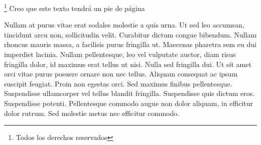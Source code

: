 \documentclass{article}
\begin{document}
    \footnote{Todos los derechos reservados} Creo que este texto tendrá un pie de página

    Nullam at purus vitae erat sodales molestie a quis urna. Ut sed leo accumsan, tincidunt arcu non, sollicitudin velit. Curabitur dictum congue bibendum. Nullam rhoncus mauris massa, a facilisis purus fringilla ut. Maecenas pharetra sem eu dui imperdiet lacinia. Nullam pellentesque, leo vel vulputate auctor, diam risus fringilla dolor, id maximus erat tellus ut nisi. Nulla sed fringilla dui. Ut sit amet orci vitae purus posuere ornare non nec tellus. Aliquam consequat ac ipsum suscipit feugiat. Proin non egestas orci. Sed maximus finibus pellentesque. Suspendisse ullamcorper vel tellus blandit fringilla. Suspendisse quis dictum eros. Suspendisse potenti. Pellentesque commodo augue non dolor aliquam, in efficitur dolor rutrum. Sed molestie metus nec efficitur commodo.
\end{document}
